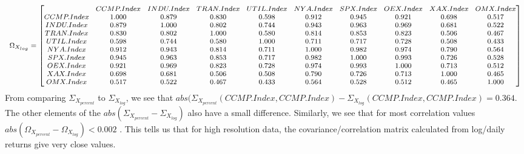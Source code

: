 \documentclass{article}
\begin{document}
\begin{equation*}
\begin{medsize}
\Omega_{X_{log}}=%
\begin{bmatrix}{}
& CCMP.Index & INDU.Index & TRAN.Index & UTIL.Index & NYA.Index & SPX.Index & OEX.Index & XAX.Index & OMX.Index \\ 
  CCMP.Index & 1.000 & 0.879 & 0.830 & 0.598 & 0.912 & 0.945 & 0.921 & 0.698 & 0.517 \\ 
  INDU.Index & 0.879 & 1.000 & 0.802 & 0.744 & 0.943 & 0.963 & 0.969 & 0.681 & 0.522 \\ 
  TRAN.Index & 0.830 & 0.802 & 1.000 & 0.580 & 0.814 & 0.853 & 0.823 & 0.506 & 0.467 \\ 
  UTIL.Index & 0.598 & 0.744 & 0.580 & 1.000 & 0.711 & 0.717 & 0.728 & 0.508 & 0.433 \\ 
  NYA.Index & 0.912 & 0.943 & 0.814 & 0.711 & 1.000 & 0.982 & 0.974 & 0.790 & 0.564 \\ 
  SPX.Index & 0.945 & 0.963 & 0.853 & 0.717 & 0.982 & 1.000 & 0.993 & 0.726 & 0.528 \\ 
  OEX.Index & 0.921 & 0.969 & 0.823 & 0.728 & 0.974 & 0.993 & 1.000 & 0.713 & 0.512 \\ 
  XAX.Index & 0.698 & 0.681 & 0.506 & 0.508 & 0.790 & 0.726 & 0.713 & 1.000 & 0.465 \\ 
  OMX.Index & 0.517 & 0.522 & 0.467 & 0.433 & 0.564 & 0.528 & 0.512 & 0.465 & 1.000 \\ 
  \end{bmatrix}
\end{medsize}
\end{equation*}
From comparing \(\Sigma_{X_{percent}}\) to \(\Sigma_{X_{log}}\), we see that \(abs(\Sigma_{X_{percent}}(CCMP.Index,CCMP.Index) - \Sigma_{X_{log}}(CCMP.Index,CCMP.Index) = 0.364 \). The other elements of the \(abs(\Sigma_{X_{percent}}-\Sigma_{X_{log}})\) also have a small difference. Similarly, we see that for most correlation values  \(abs(\Omega_{X_{percent}}- \Omega_{X_{log}}) < 0.002 \) . This tells us that for high resolution data, the covariance/correlation matrix calculated from log/daily returns give very close values.
\end{document}
